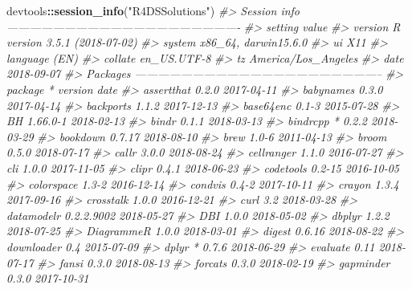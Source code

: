 \documentclass[]{book}
\newenvironment{Shaded}{\begin{snugshade}}{\end{snugshade}}
\newcommand{\CommentTok}[1]{\textcolor[rgb]{0.56,0.35,0.01}{\textit{#1}}}
\newcommand{\KeywordTok}[1]{\textcolor[rgb]{0.13,0.29,0.53}{\textbf{#1}}}
\newcommand{\NormalTok}[1]{#1}
\newcommand{\OperatorTok}[1]{\textcolor[rgb]{0.81,0.36,0.00}{\textbf{#1}}}
\newcommand{\StringTok}[1]{\textcolor[rgb]{0.31,0.60,0.02}{#1}}
\theoremstyle{plain}
\theoremstyle{remark}
\begin{document}
\begin{Shaded}
\begin{Highlighting}[]
\NormalTok{devtools}\OperatorTok{::}\KeywordTok{session_info}\NormalTok{(}\StringTok{"R4DSSolutions"}\NormalTok{)}
\CommentTok{#> Session info -------------------------------------------------------------}
\CommentTok{#>  setting  value                       }
\CommentTok{#>  version  R version 3.5.1 (2018-07-02)}
\CommentTok{#>  system   x86_64, darwin15.6.0        }
\CommentTok{#>  ui       X11                         }
\CommentTok{#>  language (EN)                        }
\CommentTok{#>  collate  en_US.UTF-8                 }
\CommentTok{#>  tz       America/Los_Angeles         }
\CommentTok{#>  date     2018-09-07}
\CommentTok{#> Packages -----------------------------------------------------------------}
\CommentTok{#>  package        * version    date      }
\CommentTok{#>  assertthat       0.2.0      2017-04-11}
\CommentTok{#>  babynames        0.3.0      2017-04-14}
\CommentTok{#>  backports        1.1.2      2017-12-13}
\CommentTok{#>  base64enc        0.1-3      2015-07-28}
\CommentTok{#>  BH               1.66.0-1   2018-02-13}
\CommentTok{#>  bindr            0.1.1      2018-03-13}
\CommentTok{#>  bindrcpp       * 0.2.2      2018-03-29}
\CommentTok{#>  bookdown         0.7.17     2018-08-10}
\CommentTok{#>  brew             1.0-6      2011-04-13}
\CommentTok{#>  broom            0.5.0      2018-07-17}
\CommentTok{#>  callr            3.0.0      2018-08-24}
\CommentTok{#>  cellranger       1.1.0      2016-07-27}
\CommentTok{#>  cli              1.0.0      2017-11-05}
\CommentTok{#>  clipr            0.4.1      2018-06-23}
\CommentTok{#>  codetools        0.2-15     2016-10-05}
\CommentTok{#>  colorspace       1.3-2      2016-12-14}
\CommentTok{#>  condvis          0.4-2      2017-10-11}
\CommentTok{#>  crayon           1.3.4      2017-09-16}
\CommentTok{#>  crosstalk        1.0.0      2016-12-21}
\CommentTok{#>  curl             3.2        2018-03-28}
\CommentTok{#>  datamodelr       0.2.2.9002 2018-05-27}
\CommentTok{#>  DBI              1.0.0      2018-05-02}
\CommentTok{#>  dbplyr           1.2.2      2018-07-25}
\CommentTok{#>  DiagrammeR       1.0.0      2018-03-01}
\CommentTok{#>  digest           0.6.16     2018-08-22}
\CommentTok{#>  downloader       0.4        2015-07-09}
\CommentTok{#>  dplyr          * 0.7.6      2018-06-29}
\CommentTok{#>  evaluate         0.11       2018-07-17}
\CommentTok{#>  fansi            0.3.0      2018-08-13}
\CommentTok{#>  forcats          0.3.0      2018-02-19}
\CommentTok{#>  gapminder        0.3.0      2017-10-31}

\end{Highlighting}
\end{Shaded}
\end{document}
